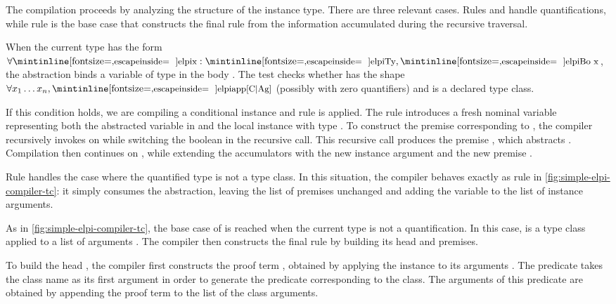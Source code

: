 The compilation proceeds by analyzing the structure of the instance type.
There are three relevant cases. Rules  and
 handle quantifications, while rule
 is the base case that constructs the final \elpi rule
from the information accumulated during the recursive traversal.

When the current type has the form $\forall \eI{x}: \eI{Ty}, \eI{Bo x}$, the
abstraction binds a variable of type  in the body . The test
 checks whether  has the shape $\forall x_1 \dots x_n,
\eI{app[C|Ag]}$ (possibly with zero quantifiers) and  is a declared type class.

If this condition holds, we are compiling a conditional instance and rule
 is applied. The rule introduces a fresh nominal variable
 representing both the abstracted variable in  and the local
instance with type . To construct the premise
corresponding to , the compiler recursively invokes  on 
while switching the boolean in the recursive call. This recursive call produces the
premise , which abstracts . Compilation then continues on %
, while extending the accumulators with the new instance argument
 and the new premise .

Rule  handles the case where the quantified type is
not a type class. In this situation, the compiler behaves exactly as rule
 in \cref{fig:simple-elpi-compiler-tc}: it simply
consumes the abstraction, leaving the list of premises  unchanged
and adding the variable  to the list of instance arguments.

As in \cref{fig:simple-elpi-compiler-tc}, the base case of  is reached
when the current type  is not a quantification. In this case,  is
a type class  applied to a list of arguments . The compiler then
constructs the final rule by building its head and premises.

To build the head , the compiler first constructs the proof term
, obtained by applying the instance  to its arguments
. %
The predicate
 takes the class name as its first argument in order to
generate the predicate corresponding to the class. The arguments of this
predicate are obtained by appending the proof term to the list of the class
arguments.

